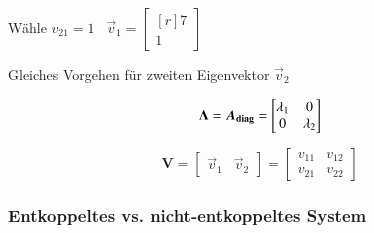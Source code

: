 \begin{minipage}[c]{0.4\columnwidth}
    Wähle $v_{21} = 1$ \quad \textrightarrow\ $ \vec{v}_1 = \begin{bmatrix*}[r] 7 \\ 1 \end{bmatrix*} $
\end{minipage}
\hfill
\begin{minipage}[c]{0.56\columnwidth}
   Gleiches Vorgehen für zweiten Eigenvektor $\vec{v}_2$
\end{minipage}

\begin{minipage}[c]{0.48\columnwidth}
    $$ \bm{\Lambda} = \bm{A_{\rm diag}} =  \begin{bmatrix} \lambda_1 & 0 \\ 0 & \lambda_2 \end{bmatrix} $$
\end{minipage}
\hfill
\begin{minipage}[c]{0.48\columnwidth}
    $$ \bm{V} = \begin{bmatrix} \vec{v}_1 & \vec{v}_2 \end{bmatrix} = \begin{bmatrix} v_{11} & v_{12} \\ v_{21} & v_{22} \end{bmatrix} $$
\end{minipage}


\subsubsection{Entkoppeltes vs. nicht-entkoppeltes System}

